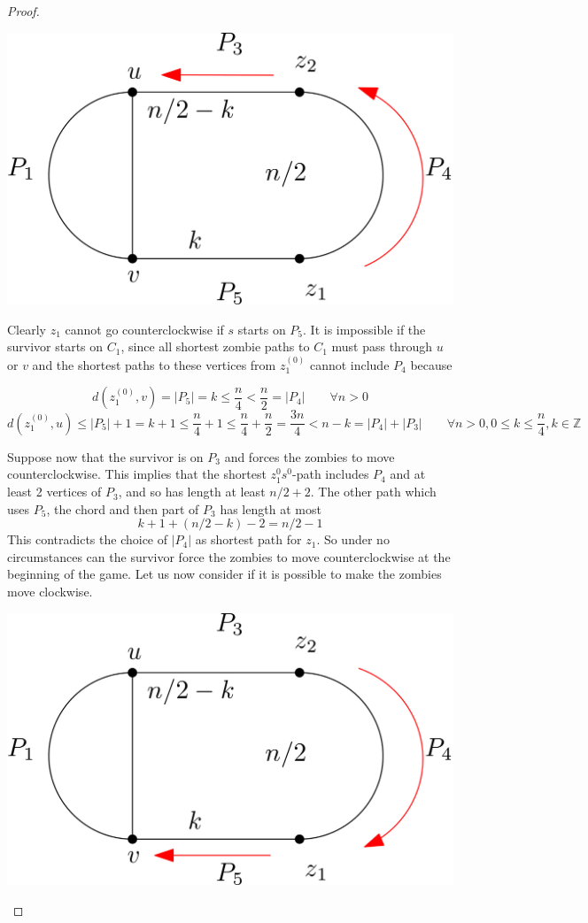 \documentclass[letterpaper, 10pt]{article}
\newcommand{\Z}{\mathbb{Z}}
\begin{document}
\begin{proof}
\begin{center}
\includegraphics[scale=0.15]{diagramCaseI_1}
\end{center}

Clearly $z_1$ cannot go counterclockwise if $s$ starts on $P_5$.
It is impossible if the survivor starts on $C_1$, since all shortest zombie paths
to $C_1$ must pass through $u$ or $v$ and the shortest paths to these vertices from $z_1^{(0)}$
cannot include $P_4$ because

\[ d(z_1^{(0)}, v) = |P_5| = k \leq \frac{n}{4} < \frac{n}{2} = |P_4| \qquad \forall n > 0\]
\[ d(z_1^{(0)}, u) \leq |P_5| + 1 = k + 1 \leq \frac{n}{4} +1 \leq \frac{n}{4} + \frac{n}{2} = \frac{3n}{4} < n -k = |P_4| + |P_3| \qquad \forall n > 0, 0 \leq k \leq \frac{n}{4}, k \in \Z\]

Suppose now that the survivor is on $P_3$ and forces the zombies to move counterclockwise.
This implies that the shortest $z_1^0s^0$-path includes $P_4$ and at least 2 vertices of $P_3$,
and so has length at least $n/2 + 2$. The other path which uses $P_5$,
the chord and then part of $P_3$ has length at most
\[k + 1 + (n/2 -k) -2 = n/2 -1\]
This contradicts the choice of $|P_4|$ as shortest path for $z_1$.
So under no circumstances can the survivor force the zombies to move counterclockwise
at the beginning of the game.
Let us now consider if it is possible to make the zombies move clockwise.

\begin{center}
\includegraphics[scale=0.15]{diagramCaseI_2}
\end{center}


\end{proof}
\end{document}
